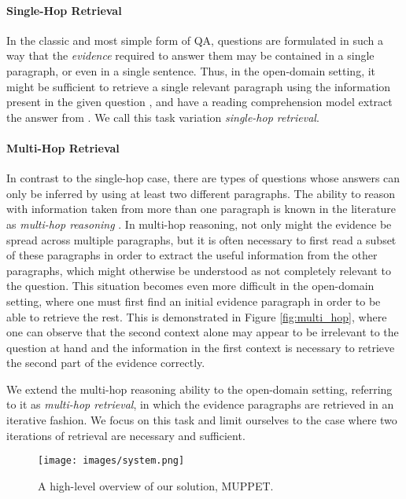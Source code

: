 \documentclass[11pt,a4paper,dvipsnames]{article}
\begin{document}
\paragraph{Single-Hop Retrieval}
In the classic and most simple form of QA, questions are formulated in such a way that the \textit{evidence} required to answer them may be contained in a single paragraph, or even in a single sentence. Thus, in the open-domain setting, it might be sufficient to retrieve a single relevant paragraph  using the information present in the given question , and have a reading comprehension model extract the answer  from . We call this task variation \textit{single-hop retrieval}.

\paragraph{Multi-Hop Retrieval}
In contrast to the single-hop case, there are types of questions whose answers can only be inferred by using at least two different paragraphs. The ability to reason with information taken from more than one paragraph is known in the literature as \textit{multi-hop reasoning} \citep{WelblSR18wikihop}. 
In multi-hop reasoning, not only might the evidence be spread across multiple paragraphs, but it is often necessary to first read a subset of these paragraphs in order to extract the useful information from the other paragraphs, which might otherwise be understood as not completely relevant to the question. This situation becomes even more difficult in the open-domain setting, where one must first find an initial evidence paragraph in order to be able to retrieve the rest. This is demonstrated in Figure \ref{fig:multi_hop}, where one can observe that the second context alone may appear to be irrelevant to the question at hand and the information in the first context is necessary to retrieve the second part of the evidence correctly. 

We extend the multi-hop reasoning ability to the open-domain setting, referring to it as \textit{multi-hop retrieval}, in which the evidence paragraphs are retrieved in an iterative fashion. We focus on this task and limit ourselves to the case where two iterations of retrieval are necessary and sufficient.


\begin{figure*}[!htb]
\centering
\texttt{[image: images/system.png]}

\caption{A high-level overview of our solution, MUPPET.}
\label{fig:pipeline}
\end{figure*}
\end{document}
